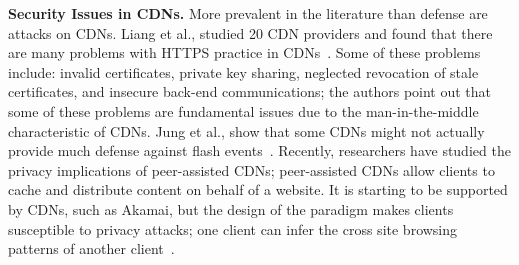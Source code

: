 \textbf{Security Issues in CDNs.} More prevalent in the literature than defense are attacks on CDNs.  Liang et al., studied 
20 CDN providers and found that there are many problems with HTTPS practice in CDNs~\cite{liang2014https}.  Some of these 
problems include: invalid certificates, private key sharing, neglected revocation of stale certificates, and 
insecure back-end communications; the authors point out that some of these problems are fundamental issues due to 
the man-in-the-middle characteristic of CDNs.  %
Jung et al., show 
that some CDNs might not actually provide much defense against flash events~\cite{jung2002flash}.  Recently, researchers have studied the privacy implications of peer-assisted CDNs; peer-assisted CDNs allow clients to cache and distribute 
content on behalf of a website.  It is starting to be supported by CDNs, such as Akamai, but the design of the paradigm
makes clients susceptible to privacy attacks; one client can infer the cross site browsing patterns of another client~\cite{jia2016anonymity}.


